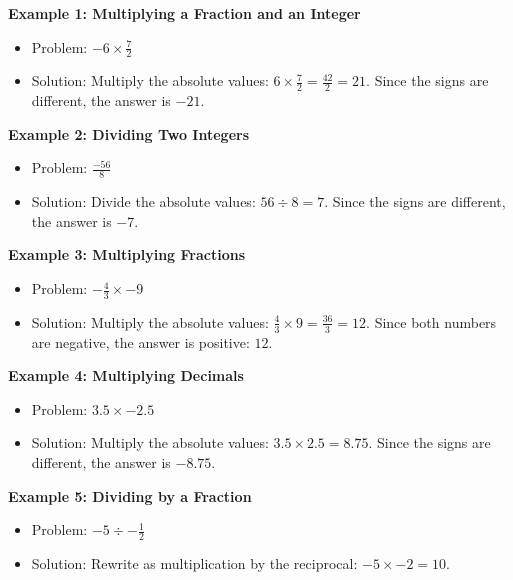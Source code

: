 \documentclass[12pt]{article}
\begin{document}
\begin{tcolorbox}[colframe=black!60, colback=white, 
coltitle=black, colbacktitle=black!15, fonttitle=\bfseries\Large, 
title=Examples, halign title=center, left=10pt, right=10pt, top=10pt, bottom=15pt]
\textbf{Example 1: Multiplying a Fraction and an Integer}
\begin{itemize}
    \item Problem: \( -6 \times \frac{7}{2} \)
    \item Solution: Multiply the absolute values: \( 6 \times \frac{7}{2} = \frac{42}{2} = 21 \). Since the signs are different, the answer is \( -21 \).
\end{itemize}

\textbf{Example 2: Dividing Two Integers}
\begin{itemize}
    \item Problem: \( \frac{-56}{8} \)
    \item Solution: Divide the absolute values: \( 56 \div 8 = 7 \). Since the signs are different, the answer is \( -7 \).
\end{itemize}

\textbf{Example 3: Multiplying Fractions}
\begin{itemize}
    \item Problem: \( -\frac{4}{3} \times -9 \)
    \item Solution: Multiply the absolute values: \( \frac{4}{3} \times 9 = \frac{36}{3} = 12 \). Since both numbers are negative, the answer is positive: \( 12 \).
\end{itemize}

\textbf{Example 4: Multiplying Decimals}
\begin{itemize}
    \item Problem: \( 3.5 \times -2.5 \)
    \item Solution: Multiply the absolute values: \( 3.5 \times 2.5 = 8.75 \). Since the signs are different, the answer is \( -8.75 \).
\end{itemize}

\textbf{Example 5: Dividing by a Fraction}
\begin{itemize}
    \item Problem: \( -5 \div -\frac{1}{2} \)
    \item Solution: Rewrite as multiplication by the reciprocal: \( -5 \times -2 = 10 \).
\end{itemize}
\end{tcolorbox}

\vspace{1em}
\end{document}
